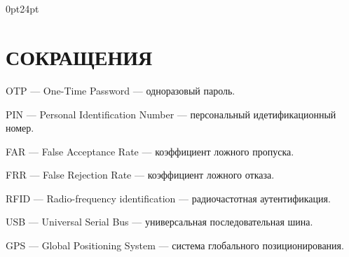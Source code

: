 \titlespacing\section{\parindent}{0pt}{24pt}
\section*{\hfill{\centering\normalsize СОКРАЩЕНИЯ}\hfill}

OTP --- One-Time Password --- одноразовый пароль.

PIN --- Personal Identification Number --- персональный идетификационный номер.

FAR --- False Acceptance Rate --- коэффициент ложного пропуска.

FRR --- False Rejection Rate --- коэффициент ложного отказа.

RFID --- Radio-frequency identification --- радиочастотная аутентификация.

USB --- Universal Serial Bus --- универсальная последовательная шина.

GPS --- Global Positioning System --- система глобального позиционирования.